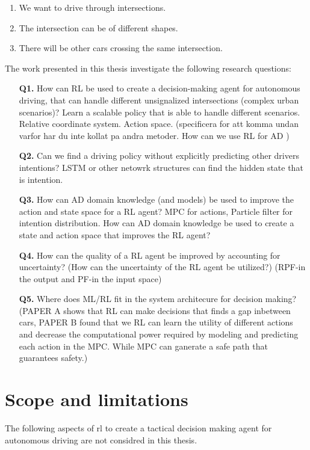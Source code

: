 \begin{enumerate}
	\item We want to drive through intersections. 
	\item The intersection can be of different shapes. %
	\item There will be other cars crossing the same intersection. 
	
\end{enumerate}

The work presented in this thesis investigate the following research questions:
\begin{enumerate}
	\item[\textbf{Q1.}] How can RL be used to create a decision-making agent for autonomous driving, that can handle different unsignalized intersections (complex urban scenarios)? Learn a scalable policy that is able to handle different scenarios. Relative coordinate system. Action space. 
	(specificera for att komma undan varfor har du inte kollat pa andra metoder. How can we use RL for AD )
	\item[\textbf{Q2.}] Can we find a driving policy without explicitly predicting other drivers intentions?
	LSTM or other netowrk structures can find the hidden state that is intention. 
	\item[\textbf{Q3.}] How can AD domain knowledge (and models) be used to improve the action and state space for a RL agent? MPC for actions, Particle filter for intention distribution. How can AD domain knowledge be used to create a state and action space that improves the RL agent?
	\item[\textbf{Q4.}] How can the quality of a RL agent be improved by accounting for uncertainty?
	(How can the uncertainty of the RL agent be utilized?) (RPF-in the output and PF-in the input space)

	\item[\textbf{Q5.}] Where does ML/RL fit in the system architecure for decision making?
	(PAPER A shows that RL can make decisions that finds a gap inbetween cars, PAPER B found that we RL can learn the utility of different actions and decrease the computational power required by modeling and predicting each action in the MPC. While MPC can ganerate a safe path that guarantees safety.) 
\end{enumerate}



\section{Scope and limitations}
The following aspects of \gls{rl} to create a tactical decision making agent for autonomous driving are not considred in this thesis. 

